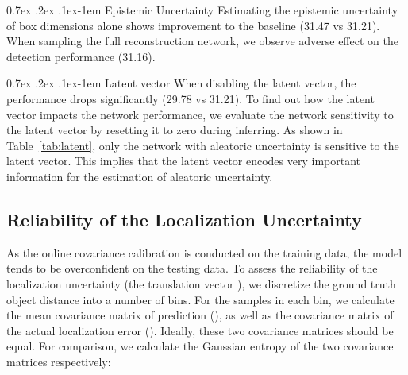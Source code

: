 \documentclass[10pt,twocolumn,letterpaper]{article}
\makeatletter
\renewcommand{\paragraph}{
  \@startsection{paragraph}{4}
  {\z@}{0.7ex \@plus .2ex \@minus .1ex}{-1em}
  {\normalfont\normalsize\bfseries}
}
\makeatother
\begin{document}
\paragraph{Epistemic Uncertainty} Estimating the epistemic uncertainty of box dimensions alone shows improvement to the baseline (31.47 vs 31.21). When sampling the full reconstruction network, we observe adverse effect on the detection performance (31.16).

\paragraph{Latent vector} When disabling the latent vector, the performance drops significantly (29.78 vs 31.21). To find out how the latent vector impacts the network performance, we evaluate the network sensitivity to the latent vector by resetting it to zero during inferring. As shown in Table~\ref{tab:latent}, only the network with aleatoric uncertainty is sensitive to the latent vector. This implies that the latent vector encodes very important information for the estimation of aleatoric uncertainty.

\begin{table}[t]
    \vspace*{-2mm}
    \begin{center}
    \end{center}
    \vspace{-1mm}
    \caption{\textbf{Performance sensitivity to the latent vector}.}
    \label{tab:latent}
\end{table}

\subsection{Reliability of the Localization Uncertainty}
As the online covariance calibration is conducted on the training data, the model tends to be overconfident on the testing data. To assess the reliability of the localization uncertainty (\wrt the translation vector ), we discretize the ground truth object distance  into a number of bins. For the samples in each bin, we calculate the mean covariance matrix of prediction (), as well as the covariance matrix of the actual localization error (). Ideally, these two covariance matrices should be equal. For comparison, we calculate the Gaussian entropy of the two covariance matrices respectively:
\end{document}
